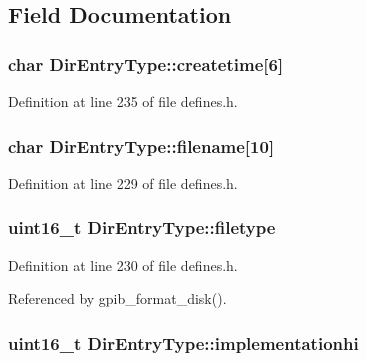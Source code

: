 \subsection{Field Documentation}
\subsubsection[{\texorpdfstring{createtime}{createtime}}]{\setlength{\rightskip}{0pt plus 5cm}char Dir\+Entry\+Type\+::createtime\mbox{[}6\mbox{]}}\hypertarget{structDirEntryType_a627fd55537c73d4fee596b140e106c01}{}\label{structDirEntryType_a627fd55537c73d4fee596b140e106c01}


Definition at line 235 of file defines.\+h.

\subsubsection[{\texorpdfstring{filename}{filename}}]{\setlength{\rightskip}{0pt plus 5cm}char Dir\+Entry\+Type\+::filename\mbox{[}10\mbox{]}}\hypertarget{structDirEntryType_aa60fae0a6b7ba9c966cbcf46e555f396}{}\label{structDirEntryType_aa60fae0a6b7ba9c966cbcf46e555f396}


Definition at line 229 of file defines.\+h.

\subsubsection[{\texorpdfstring{filetype}{filetype}}]{\setlength{\rightskip}{0pt plus 5cm}uint16\+\_\+t Dir\+Entry\+Type\+::filetype}\hypertarget{structDirEntryType_ada14562440087858ebf04bc4c81eedd2}{}\label{structDirEntryType_ada14562440087858ebf04bc4c81eedd2}


Definition at line 230 of file defines.\+h.



Referenced by gpib\+\_\+format\+\_\+disk().

\subsubsection[{\texorpdfstring{implementationhi}{implementationhi}}]{\setlength{\rightskip}{0pt plus 5cm}uint16\+\_\+t Dir\+Entry\+Type\+::implementationhi}\hypertarget{structDirEntryType_a27a15eea3264d44c9e93e3be77093151}{}\label{structDirEntryType_a27a15eea3264d44c9e93e3be77093151}


